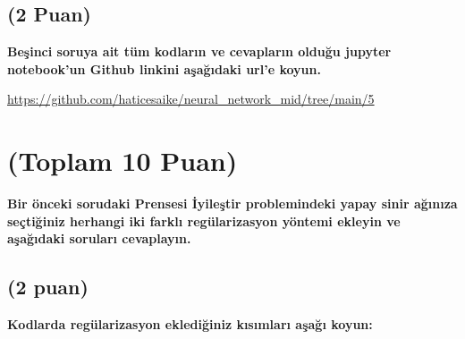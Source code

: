 \documentclass[11pt]{article}
\begin{document}
\newpage

\subsection{(2 Puan)} \textbf{Beşinci soruya ait tüm kodların ve cevapların olduğu jupyter notebook'un Github linkini aşağıdaki url'e koyun.}

\url{https://github.com/haticesaike/neural_network_mid/tree/main/5}

\section{(Toplam 10 Puan)} \textbf{Bir önceki sorudaki Prensesi İyileştir problemindeki yapay sinir ağınıza seçtiğiniz herhangi iki farklı regülarizasyon yöntemi ekleyin ve aşağıdaki soruları cevaplayın.} 

\subsection{(2 puan)} \textbf{Kodlarda regülarizasyon eklediğiniz kısımları aşağı koyun:} 
\end{document}
